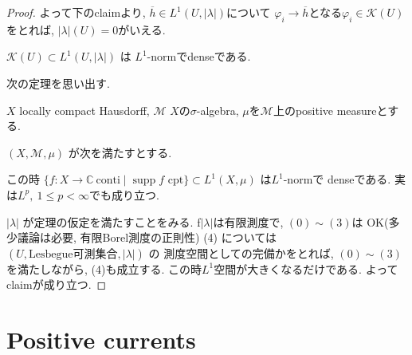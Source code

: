 \begin{proof}
よって下のclaimより, $\overline{h} \in L^1(U,|\lambda|)$について
$\varphi_i \to \overline{h}$となる$\varphi_i \in \mathcal{K}(U)$をとれば, 
$|\lambda|(U)=0$がいえる. 

\begin{claim}
\(\mathcal{K}(U)\subset L^1(U,|\lambda|)\) は
 \(L^1\)-normでdenseである. 
\end{claim}
次の定理を思い出す. 
\begin{tcolorbox}[mybox]
\begin{thm}\cite[Theorem 3.14]{Rud2}
\label{thm-Rud2-3.14}
\(X\) locally compact Hausdorff,  \(\mathcal{M}\) $X$の\(\sigma\)-algebra, 
\(\mu\)を\(\mathcal{M}\)上のpositive measureとする. 

 \((X,\mathcal{M},\mu)\) が次を満たすとする.

この時 \(\{f:X\to\mathbb{C}\ \text{conti} \mid \operatorname{supp} f \text{ cpt}\}\subset L^1(X,\mu)\)
は\(L^1\)-normで
denseである. 
実は$L^p,\ 1\leq p<\infty$でも成り立つ. 
\end{thm}
\end{tcolorbox}

\(|\lambda|\) が定理の仮定を満たすことをみる. 
f\(|\lambda|\)は有限測度で, 
$ (0)\sim (3)$は OK(多少議論は必要, 有限Borel測度の正則性)
(4) については \((U,\text{Lesbegue可測集合},|\lambda|)\) の
測度空間としての完備かをとれば, 
\((0)\sim(3)\) を満たしながら, (4)も成立する.
この時$L^1$空間が大きくなるだけである. よってclaimが成り立つ. 
\end{proof}

\section{Positive currents}

